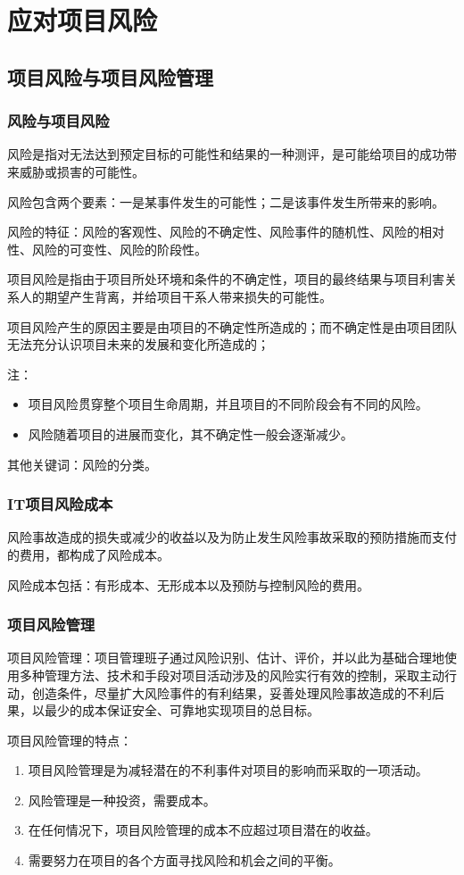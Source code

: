 \chapter{应对项目风险}
\section{项目风险与项目风险管理}
\subsection{风险与项目风险}
风险是指对无法达到预定目标的可能性和结果的一种测评，是可能给项目的成功带来威胁或损害的可能性。
\par 风险包含两个要素：一是某事件发生的可能性；二是该事件发生所带来的影响。
\par 风险的特征：风险的客观性、风险的不确定性、风险事件的随机性、风险的相对性、风险的可变性、风险的阶段性。
\par 项目风险是指由于项目所处环境和条件的不确定性，项目的最终结果与项目利害关系人的期望产生背离，并给项目干系人带来损失的可能性。
\par 项目风险产生的原因主要是由项目的不确定性所造成的；而不确定性是由项目团队无法充分认识项目未来的发展和变化所造成的；
\par 注：
\begin{itemize}
	\item 项目风险贯穿整个项目生命周期，并且项目的不同阶段会有不同的风险。
	\item 风险随着项目的进展而变化，其不确定性一般会逐渐减少。
\end{itemize}
\par 其他关键词：风险的分类。
\subsection{IT项目风险成本}
风险事故造成的损失或减少的收益以及为防止发生风险事故采取的预防措施而支付的费用，都构成了风险成本。
\par 风险成本包括：有形成本、无形成本以及预防与控制风险的费用。  
\subsection{项目风险管理}
项目风险管理：项目管理班子通过风险识别、估计、评价，并以此为基础合理地使用多种管理方法、技术和手段对项目活动涉及的风险实行有效的控制，采取主动行动，创造条件，尽量扩大风险事件的有利结果，妥善处理风险事故造成的不利后果，以最少的成本保证安全、可靠地实现项目的总目标。 
\par 项目风险管理的特点：
\begin{enumerate}
	\item 项目风险管理是为减轻潜在的不利事件对项目的影响而采取的一项活动。
	\item 风险管理是一种投资，需要成本。
	\item 在任何情况下，项目风险管理的成本不应超过项目潜在的收益。
	\item 需要努力在项目的各个方面寻找风险和机会之间的平衡。
\end{enumerate}
